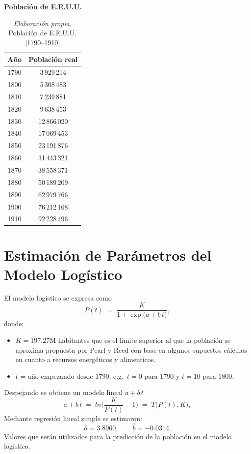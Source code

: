 \documentclass[12pt]{article}
\begin{document}
\begin{table}[ht]
  \centering
  \textbf{Población de E.E.U.U.}\\
  \vspace{0.4cm}
  \begin{tabular}{cc}
    \toprule
    Año & Población real \\
    \midrule
    1790 & 3\,929\,214  \\
    1800 & 5\,308\,483  \\
    1810 & 7\,239\,881  \\
    1820 & 9\,638\,453  \\
    1830 & 12\,866\,020 \\
    1840 & 17\,069\,453 \\
    1850 & 23\,191\,876 \\
    1860 & 31\,443\,321 \\
    1870 & 38\,558\,371 \\
    1880 & 50\,189\,209 \\
    1890 & 62\,979\,766 \\
    1900 & 76\,212\,168 \\
    1910 & 92\,228\,496 \\
    \bottomrule
  \end{tabular}
    \caption{\textit{Elaboración propia}. Población de E.E.U.U. [1790--1910]}
    \label{tab:datos}
\end{table}

\newpage
\section{Estimación de Parámetros del Modelo Logístico}  %
El modelo logístico se expresa como
\[
  P(t) \;=\;
  \frac{K}{1 + \exp\bigl(a + b\,t\bigr)},
\]
donde:
\begin{itemize}
  \item $K = 197.27$M habitantes que es el límite superior al que la población se aproxima propuesta por Pearl y Reed con base en algunos supuestos cálculos en cuanto a recursos energéticos y alimenticos.
  \item $t$ = año empezando desde 1790, e.g.\ $t=0$ para 1790 y $t=10$ para 1800.
\end{itemize}
Despejando se obtiene un modelo lineal $a + b\,t$
\[
  a + b\,t \;=\;
  \textit{ln}\!\biggl(\frac{K}{P(t)} - 1\biggr)
  \;=\; T\bigl(P(t),K\bigr),
\]
Mediante regresión lineal simple se estimaron:
\[
  \hat a = 3.8960,\qquad \hat b = -0.0314.
\]
Valores que serán utilizados para la predicción de la población en el modelo logístico.
\end{document}
